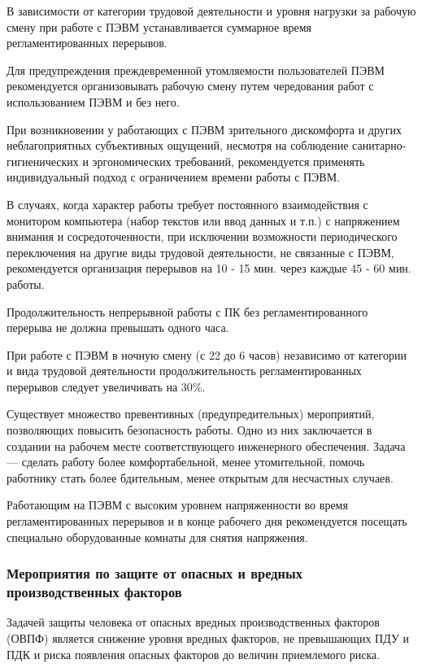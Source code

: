 В зависимости от категории трудовой деятельности и уровня нагрузки за рабочую смену при работе с ПЭВМ устанавливается суммарное время регламентированных перерывов.

Для предупреждения преждевременной утомляемости пользователей ПЭВМ рекомендуется организовывать рабочую смену путем чередования работ с использованием ПЭВМ и без него.

При возникновении у работающих с ПЭВМ зрительного дискомфорта и других неблагоприятных субъективных ощущений, несмотря на соблюдение санитарно-гигиенических и эргономических требований, рекомендуется применять индивидуальный подход с ограничением времени работы с ПЭВМ.

В случаях, когда характер работы требует постоянного взаимодействия с монитором компьютера (набор текстов или ввод данных и т.п.) с напряжением внимания и сосредоточенности, при исключении возможности периодического переключения на другие виды трудовой деятельности, не связанные с ПЭВМ, рекомендуется организация перерывов на 10 - 15 мин. через каждые 45 - 60 мин. работы.

Продолжительность непрерывной работы с ПК без регламентированного перерыва не должна превышать одного часа.

При работе с ПЭВМ в ночную смену (с 22 до 6 часов) независимо от категории и вида трудовой деятельности продолжительность регламентированных перерывов следует увеличивать на 30\%.

Существует множество превентивных (предупредительных) мероприятий, позволяющих повысить безопасность работы.
Одно из них заключается в создании на рабочем месте соответствующего инженерного обеспечения.
Задача --- сделать работу более комфортабельной, менее утомительной, помочь работнику стать более бдительным, менее открытым для несчастных случаев.

Работающим на ПЭВМ с высоким уровнем напряженности во время регламентированных перерывов и в конце рабочего дня рекомендуется посещать специально оборудованные комнаты для снятия напряжения.

\subsubsection{Мероприятия по защите от опасных и вредных производственных факторов}

Задачей защиты человека от опасных вредных производственных факторов (ОВПФ) является снижение уровня вредных факторов, не превышающих ПДУ и ПДК и риска появления опасных факторов до величин приемлемого риска.


